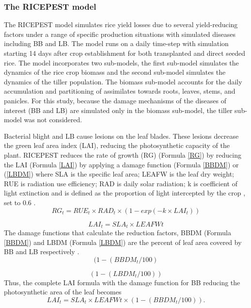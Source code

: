 \documentclass[preprint,12pt]{elsarticle}
\begin{document}
\subsubsection{The RICEPEST model}
The RICEPEST model \cite{Willocquet2000, Willocquet2002} simulates rice yield losses due to several yield-reducing factors under a range of specific production situations with simulated diseases including BB and LB. The model runs on a daily time-step with simulation starting 14 days after crop establishment for both transplanted and direct seeded rice. The model incorporates two sub-models, the first sub-model simulates the dynamics of the rice crop biomass and the second sub-model simulates the dynamics of the tiller population. The biomass sub-model accounts for the daily accumulation and partitioning of assimilates towards roots, leaves, stems, and panicles. For this study, because the damage mechanisms of the diseases of interest (BB and LB) are simulated only in the biomass sub-model, the tiller sub-model was not considered.

Bacterial blight and LB cause lesions on the leaf blades. These lesions decrease the green leaf area index (LAI), reducing the photosynthetic capacity of the plant. RICEPEST reduces the rate of growth (RG) (Formula \ref{RG}) by reducing the LAI (Formula \ref{LAI}) by applying a damage function (Formula \ref{BBDM}) or (\ref{LBDM}) where SLA is the specific leaf area; LEAFW is the leaf dry weight; RUE is radiation use efficiency; RAD is daily solar radiation; k is coefficient of light extinction and is defined as the proportion of light intercepted by the crop \cite{Willocquet2000}, set to 0.6 \cite{Willocquet2002}.
\begin{equation}
RG_t = RUE_t \times RAD_t \times (1- exp(- k \times LAI_t))
\label{RG}
\end{equation}

\begin{equation}
LAI_t = SLA_t \times LEAFWt
\label{LAI}
\end{equation}
The damage functions that calculate the reduction factors, BBDM (Formula \ref{BBDM}) and LBDM (Formula \ref{LBDM}) are the percent of leaf area covered by BB and LB respectively \cite{Willocquet2002}. 
\begin{equation}
(1-(BBDM_t /100)
\label{BBDM}
\end{equation}

\begin{equation}
(1-(LBDM_t /100))
\label{LBDM}
\end{equation}
Thus, the complete LAI formula with the damage function for BB reducing the photosynthetic area of the leaf becomes
 \begin{equation}
LAI_t = SLA_t \times LEAFWt \times (1-(BBDM_t / 100)).
\label{LAIBBDM}
\end{equation}
\end{document}
